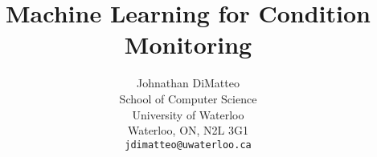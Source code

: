 \documentclass{article}
\title{Machine Learning for Condition Monitoring}
\author{
	Johnathan DiMatteo \\
	School of Computer Science\\
	University of Waterloo\\
	Waterloo, ON, N2L 3G1 \\
	\texttt{jdimatteo@uwaterloo.ca} \\
}
\begin{document}
\maketitle

\begin{abstract} 

\end{abstract} 


 
   





\newpage

\nocite{*}



\end{document}
